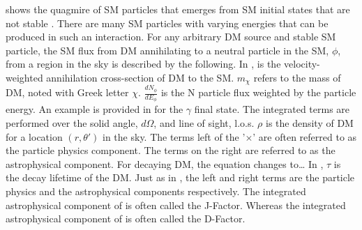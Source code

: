  shows the quagmire of SM particles that emerges from SM initial states that are not stable \cite{2021ICRC:glory_duck}.
There are many SM particles with varying energies that can be produced in such an interaction.
For any arbitrary DM source and stable SM particle, the SM flux from DM annihilating to a neutral particle in the SM, $\phi$, from a region in the sky is described by the following.
\iddmannilation
In , \sv is the velocity-weighted annihilation cross-section of DM to the SM.
$m_\chi$ refers to the mass of DM, noted with Greek letter $\chi$.
$\frac{dN_{\phi}}{dE_\phi}$ is the N particle flux weighted by the particle energy.
An example is provided in  for the $\gamma$ final state.
The integrated terms are performed over the solid angle, $d\Omega$, and line of sight, l.o.s.
$\rho$ is the density of DM for a location $(r, \theta')$ in the sky.
The terms left of the '$\times$' are often referred to as the particle physics component.
The terms on the right are referred to as the astrophysical component.
For decaying DM, the equation changes to\dots
\iddmdecay
In , $\tau$ is the decay lifetime of the DM.
Just as in , the left and right terms are the particle physics and the astrophysical components respectively.
The integrated astrophysical component of  is often called the J-Factor.
Whereas the integrated astrophysical component of  is often called the D-Factor.

\begin{figure}[h]
\end{figure}

